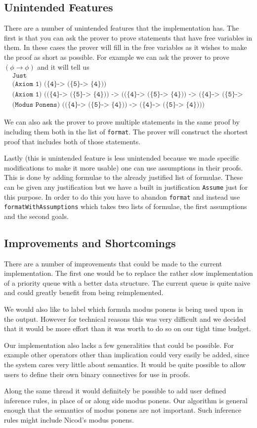 \documentclass{article}
\begin{document}
\subsection{Unintended Features}
There are a number of unintended features that the implementation has.
The first is that you can ask the prover to prove statements that have free variables in them.
In these cases the prover will fill in the free variables as it wishes to make the proof as short as possible.
For example we can ask the prover to prove $(\phi\rightarrow\phi)$ and it will tell us
\begin{align*}
&\texttt{Just}\\
&\texttt{(Axiom 1) (\{4\} -> (\{5\} -> \{4\}))}\\
&\texttt{(Axiom 1) ((\{4\} -> (\{5\} -> \{4\})) -> ((\{4\} -> (\{5\} -> \{4\})) -> (\{4\} -> (\{5\} -> \{4\}))))}\\
&\texttt{(Modus Ponens) ((\{4\} -> (\{5\} -> \{4\})) -> (\{4\} -> (\{5\} -> \{4\})))}
\end{align*} 

We can also ask the prover to prove multiple statements in the same proof by including them both in the list of \texttt{format}. The prover will construct the shortest proof that includes both of those statements.

Lastly (this is unintended feature is less unintended because we made specific modifications to make it more usable) one can use assumptions in their proofs.
This is done by adding formulae to the already justified list of formulae.
These can be given any justification but we have a built in justification \texttt{Assume} just for this purpose.
In order to do this you have to abandon \texttt{format} and instead use \texttt{formatWithAssumptions} which takes two lists of formulae, the first assumptions and the second goals.

\subsection{Improvements and Shortcomings}

There are a number of improvements that could be made to the current implementation.
The first one would be to replace the rather slow implementation of a priority queue with a better data structure.
The current queue is quite naive and could greatly benefit from being reimplemented.

We would also like to label which formula modus ponens is being used upon in the output.
However for technical reasons this was very difficult and we decided that it would be more effort than it was worth to do so on our tight time budget.

Our implementation also lacks a few generalities that could be possible.
For example other operators other than implication could very easily be added, since the system cares very little about semantics.
It would be quite possible to allow users to define their own binary connectives for use in proofs.

Along the same thread it would definitely be possible to add user defined inference rules, in place of or along side modus ponens.
Our algorithm is general enough that the semantics of modus ponens are not important.
Such inference rules might include Nicod's modus ponens.
\end{document}

